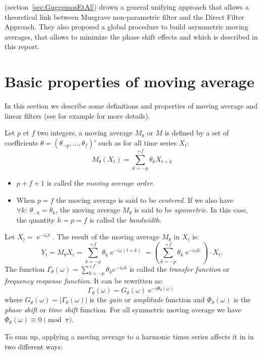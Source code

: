 \documentclass[fleqn,10pt]{latex/stylish_article} %
\DeclareMathOperator{\e}{e}
\newcommand\1{\mathds{1}}
\begin{document}
\citet{ch15HBSA} (section~\ref{sec:GuggemosEtAl}) drawn a general unifying approach that allows a theoretical link between Musgrave non-parametric filter and the Direct Filter Approach.
They also proposed a global procedure to build asymmetric moving averages, that allows to minimize the phase shift effects and which is described in this report.

\hypertarget{basic-properties-of-moving-average}{%
\section{Basic properties of moving average}\label{basic-properties-of-moving-average}}

In this section we describe some definitions and properties of moving average and linear filters (see for example \citet{ch12HBSA} for more details).

Let \(p\) et \(f\) two integers, a moving average \(M_\theta\) or \(M\) is defined by a set of coefficients \(\theta=(\theta_{-p},\dots,\theta_{f})'\) such as for all time series \(X_t\):
\[
M_\theta(X_t)=\sum_{k=-p}^{+f}\theta_kX_{t+k}
\]

\begin{itemize}
\item
  \(p+f+1\) is called the \emph{moving average order}.
\item
  When \(p=f\) the moving average is said to be \emph{centered}.
  If we also have \(\forall k:\:\theta_{-k} = \theta_k\), the moving average \(M_\theta\) is said to be \emph{symmetric}.
  In this case, the quantity \(h=p=f\) is called the \emph{bandwidth}.
\end{itemize}

Let \(X_t=\e^{-i\omega t}\). The result of the moving average \(M_\theta\) in \(X_t\) is:
\[
Y_t = M_{\theta}X_t = \sum_{k=-p}^{+f} \theta_k \e^{-i \omega (t+k)}
= \left(\sum_{k=-p}^{+f} \theta_k \e^{-i \omega k}\right)\cdot X_t.
\]
The function \(\Gamma_\theta(\omega)=\sum_{k=-p}^{+f} \theta_k e^{-i \omega k}\) is called the \emph{transfer function} or \emph{frequency response function}.
It can be rewritten as:
\[
\Gamma_\theta(\omega) = G_\theta(\omega)\e^{-i\Phi_\theta(\omega)}
\]
where \(G_\theta(\omega)=\lvert\Gamma_\theta(\omega)\rvert\) is the \emph{gain} or \emph{amplitude} function and \(\Phi_\theta(\omega)\) is the \emph{phase shift} or \emph{time shift} function.
For all symmetric moving average we have \(\Phi_\theta(\omega)\equiv 0 \pmod{\pi}\).

To sum up, applying a moving average to a harmonic times series affects it in in two different ways:
\end{document}
